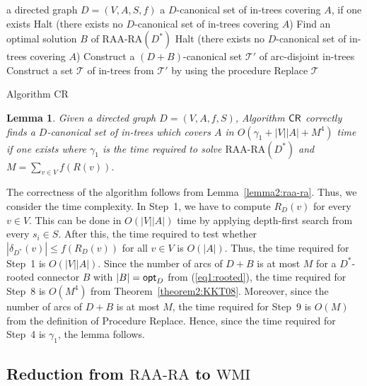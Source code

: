 \documentclass[11pt]{article}
\newcounter{ni}
\theoremstyle{plain}
\newtheorem{lemma}[theorem]{Lemma}\newtheorem{corollary}[theorem]{Corollary}\newtheorem{definition}[theorem]{Definition}\newtheorem{proposition}[theorem]{Proposition}\newtheorem{claim}[theorem]{Claim}\newtheorem{fact}[theorem]{Fact}\newtheorem{example}{Example}
\newcommand{\eop}{\hfill \usebox{\ProofSym}}
\newenvironment{proof}{\noindent {\it Proof.}}{\eop\par\vspace{0.3cm}}
\begin{document}
\begin{algorithm}[h]
\begin{algorithmic}[1]
\INPUT a directed graph $D=(V,A,S,f)$
\OUTPUT a $D$-canonical set of in-trees covering $A$, if one exists
\STATE Halt (there exists no $D$-canonical set of in-trees covering $A$)
\ENDIF
\STATE Find an optimal solution $B$ of $\mbox{RAA-RA}(D^{\ast})$
\STATE Halt (there exists no $D$-canonical set of in-trees covering $A$)
\ELSE
\STATE Construct a $(D+B)$-canonical set $\mathcal{T}'$ of arc-disjoint in-trees
\STATE Construct a set $\mathcal{T}$ of in-trees from $\mathcal{T}'$ by using the procedure {\sf Replace}
\RETURN $\mathcal{T}$ 
\ENDIF
\end{algorithmic}
\caption{Algorithm {\sf CR}}
\label{Algorithm:Algorithm1}
\end{algorithm}

\begin{lemma} \label{lemma1:computation}
Given a directed graph $D=(V,A,f,S)$, Algorithm ${\sf CR}$ correctly 
finds a $D$-canonical set of in-trees which covers $A$ in $O(\gamma_1 + |V||A|+ M^4)$ time if one exists where 
$\gamma_1$ is the time required to solve $\mbox{RAA-RA}(D^{\ast})$ and 
$M=\sum_{v \in V}f(R(v))$. 
\end{lemma}
\begin{proof}
The correctness of the algorithm follows from Lemma~\ref{lemma2:raa-ra}. Thus, 
we consider the time complexity. 
In Step~1, we have to compute $R_D(v)$ for every $v \in V$. 
This can be done in $O(|V||A|)$ time by applying depth-first search from every $s_i \in S$. 
After this, the time required to test whether $|\delta_{D^{\ast}}(v)| \le f(R_D(v))$ for all $v\in V$ 
is $O(|A|)$. Thus, the time required for Step~1 is $O(|V||A|)$. 
Since the number of arcs of $D+B$ is at most $M$ for a $D^{\ast}$-rooted connector $B$ with
$|B|={\sf opt}_D$ from (\ref{eq1:rooted}), the time required for Step~8 is $O(M^4)$
from Theorem~\ref{theorem2:KKT08}. 
Moreover, since the number of arcs of $D+B$ is at most $M$, the time required for Step~9
is $O(M)$ from the definition of Procedure {\sf Replace}.
Hence, since the time required for Step~4 is $\gamma_1$, the lemma follows. 
\end{proof}

\subsection{Reduction from $\mbox{RAA-RA}$ to $\mbox{WMI}$}
\end{document}
